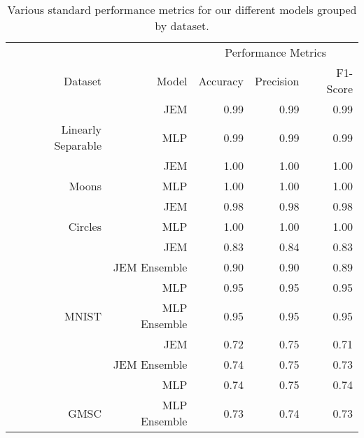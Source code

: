 \begin{table}

\caption{Various standard performance metrics for our different models grouped by dataset. \label{tab:perf} \newline}
\centering
\fontsize{8}{10}\selectfont
\begin{tabular}[t]{rrrrr}
\toprule
\multicolumn{2}{c}{ } & \multicolumn{3}{c}{Performance Metrics} \\
\cmidrule(l{3pt}r{3pt}){3-5}
Dataset & Model & Accuracy & Precision & F1-Score\\
\midrule
 & JEM & 0.99 & 0.99 & 0.99\\

\multirow[t]{-2}{*}{\raggedleft\arraybackslash Linearly Separable} & MLP & 0.99 & 0.99 & 0.99\\
\cmidrule{1-5}
 & JEM & 1.00 & 1.00 & 1.00\\

\multirow[t]{-2}{*}{\raggedleft\arraybackslash Moons} & MLP & 1.00 & 1.00 & 1.00\\
\cmidrule{1-5}
 & JEM & 0.98 & 0.98 & 0.98\\

\multirow[t]{-2}{*}{\raggedleft\arraybackslash Circles} & MLP & 1.00 & 1.00 & 1.00\\
\cmidrule{1-5}
 & JEM & 0.83 & 0.84 & 0.83\\

 & JEM Ensemble & 0.90 & 0.90 & 0.89\\

 & MLP & 0.95 & 0.95 & 0.95\\

\multirow[t]{-4}{*}{\raggedleft\arraybackslash MNIST} & MLP Ensemble & 0.95 & 0.95 & 0.95\\
\cmidrule{1-5}
 & JEM & 0.72 & 0.75 & 0.71\\

 & JEM Ensemble & 0.74 & 0.75 & 0.73\\

 & MLP & 0.74 & 0.75 & 0.74\\

\multirow[t]{-4}{*}{\raggedleft\arraybackslash GMSC} & MLP Ensemble & 0.73 & 0.74 & 0.73\\
\bottomrule
\end{tabular}
\end{table}
